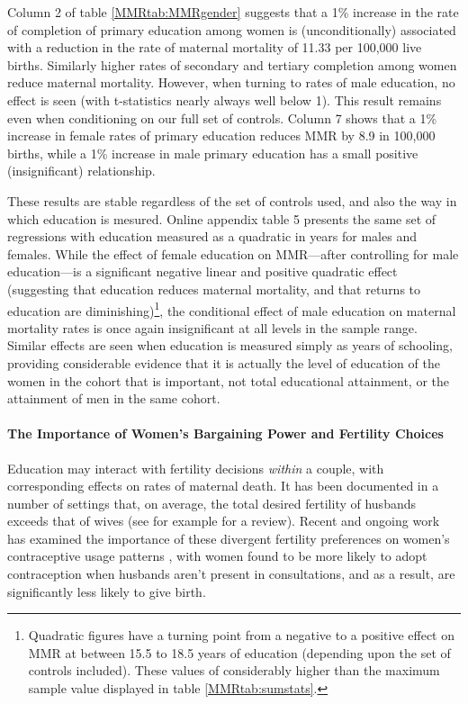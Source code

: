 \documentclass{article}[12pt,subeqn]
\begin{document}
\begin{spacing}{1.4}
Column 2 of table \ref{MMRtab:MMRgender} suggests that a 1\% increase in the
rate of completion of primary education among women is (unconditionally) 
associated with a reduction in the rate of maternal mortality of 11.33 per 
100,000 live births.  Similarly higher rates of secondary and tertiary 
completion among women reduce maternal mortality.  However, when turning to 
rates of male education, no effect is seen (with t-statistics nearly always
well below 1).  This result remains even when conditioning on our full set
of controls.  Column 7 shows that a 1\% increase in female rates of primary
education reduces MMR by 8.9 in 100,000 births, while a 1\% increase in male
primary education has a small positive (insignificant) relationship.

These results are stable regardless of the set of controls used, and also the
way in which education is mesured.  Online appendix table 5 presents the same
set of regressions with education measured as a quadratic
in years for males and females.  While the effect of female education on 
MMR---after controlling for male education---is a significant negative linear 
and positive quadratic effect (suggesting that education reduces maternal 
mortality, and that returns to education are diminishing)\footnote{Quadratic 
figures have a turning point from a negative to a positive effect on MMR at 
between 15.5 to 18.5 years of education (depending upon the set of controls 
included).  These values of considerably higher than the maximum sample value 
displayed in table \ref{MMRtab:sumstats}.}, the conditional effect of male 
education on maternal mortality rates is once again insignificant at all
levels in the sample range.  Similar effects are seen when education is
measured simply as years of schooling, providing considerable evidence that
it is actually the level of education of the women in the cohort that is 
important, not total educational attainment, or the attainment of men in the 
same cohort.

\paragraph{The Importance of Women's Bargaining Power and Fertility Choices}
Education may interact with fertility decisions \emph{within} a couple, with
corresponding effects on rates of maternal death.  It has been documented in
a number of settings that, on average, the total desired fertility of
husbands exceeds that of wives (see for example \citet{UN2001} for a review).
Recent and ongoing work has examined the importance of these divergent
fertility preferences on women's contraceptive usage patterns
\citep{Ashrafetal2014}, with women found to be more likely to adopt
contraception when husbands aren't present in consultations, and as a
result, are significantly less likely to give birth.


\end{spacing}
\end{document}
